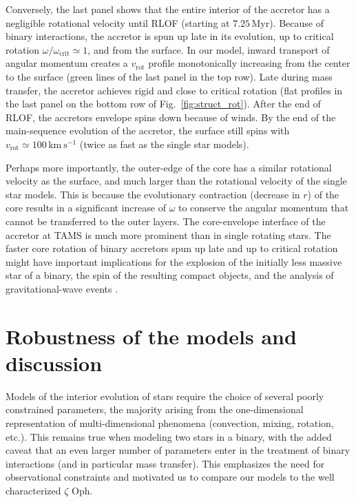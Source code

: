 \documentclass[twocolumn,twocolappendix,trackchanges]{aastex63}
\newcommand{\kms}{{\mathrm{km\ s^{-1}}}}
\DeclareRobustCommand{\Figref}[1]{Fig.~\ref{#1}}
\newcommand{\zoph}{$\zeta$ Oph}
\begin{document}
Conversely, the last panel shows that the entire interior of the
accretor has a negligible rotational velocity until RLOF (starting at
$7.25$\,Myr). Because of binary interactions, the accretor is spun up
late in its evolution, up to critical rotation
$\omega/\omega_\mathrm{crit}\simeq1$, and from the surface. In our model,
inward transport of angular momentum creates a $v_\mathrm{rot}$
profile monotonically increasing from the center to the surface (green lines of
the last panel in the top row). Late during mass transfer, the accretor achieves rigid
and close to critical rotation (flat profiles in the last panel on the
bottom row of \Figref{fig:struct_rot}). After the end
of RLOF, the accretors envelope spins down because of winds. By the
end of the main-sequence evolution of the accretor, the surface still
spins with $v_\mathrm{rot}\simeq100\,\kms$ (twice as fast as the
single star models).

Perhaps more importantly, the outer-edge of the core has a similar
rotational velocity as the surface, and much larger than the
rotational velocity of the single star models. This is because the
evolutionary contraction (decrease in $r$) of the core results in a
significant increase of $\omega$ to conserve the angular momentum that
cannot be transferred to the outer layers. The core-envelope interface
of the accretor at TAMS is much more prominent than in single rotating
stars. The faster core rotation of binary accretors spun up late and
up to critical rotation might have important implications for the
explosion of the initially less massive star of a binary, the
spin of the resulting compact objects, and the analysis of
gravitational-wave events \citep[e.g.,][]{zaldarriaga:18, qin:18, callister:21}.

\section{Robustness of the models and discussion}
\label{sec:discussion}

Models of the interior evolution of stars require the choice of
several poorly constrained parameters, the majority arising from the
one-dimensional representation of multi-dimensional phenomena
(convection, mixing, rotation, etc.). This remains true when modeling
two stars in a binary, with the added caveat that an even larger
number of parameters enter in the treatment of binary interactions (and in
particular mass transfer). This emphasizes the need for
observational constraints and motivated us to compare our models to
the well characterized \zoph.
\end{document}
